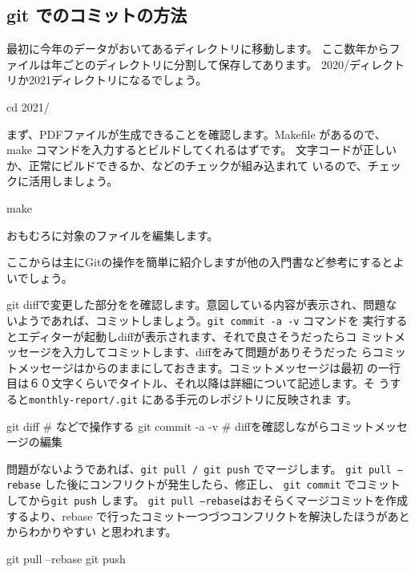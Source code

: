 \documentclass[mingoth,a4paper]{jsarticle}
\begin{document}
\subsection{git でのコミットの方法}

最初に今年のデータがおいてあるディレクトリに移動します。
ここ数年からファイルは年ごとのディレクトリに分割して保存してあります。
2020/ディレクトリか2021ディレクトリになるでしょう。

\begin{commandline}
cd 2021/
\end{commandline}

まず、PDFファイルが生成できることを確認します。Makefile があるので、make 
コマンドを入力するとビルドしてくれるはずです。
文字コードが正しいか、正常にビルドできるか、などのチェックが組み込まれて
いるので、チェックに活用しましょう。

\begin{commandline}
 make
\end{commandline}

おもむろに対象のファイルを編集します。

ここからは主にGitの操作を簡単に紹介しますが他の入門書など参考にするとよいでしょう。

git diffで変更した部分をを確認します。意図している内容が表示され、問題な
いようであれば、コミットしましょう。\texttt{git commit -a -v} コマンドを
実行するとエディターが起動しdiffが表示されます、それで良さそうだったらコ
ミットメッセージを入力してコミットします、diffをみて問題がありそうだった
らコミットメッセージはからのままにしておきます。コミットメッセージは最初
の一行目は６０文字くらいでタイトル、それ以降は詳細について記述します。そ
うすると\texttt{monthly-report/.git} にある手元のレポジトリに反映されま
す。

\begin{commandline}
 git diff  # などで操作する
 git commit -a -v  # diffを確認しながらコミットメッセージの編集 
\end{commandline}

問題がないようであれば、\texttt{git pull / git push} でマージします。
\texttt{git pull --rebase} した後にコンフリクトが発生したら、修正し、
\texttt{git commit} でコミットしてから\texttt{git push} します。
\texttt{git pull --rebase}はおそらくマージコミットを作成するより、rebase
で行ったコミット一つづつコンフリクトを解決したほうがあとからわかりやすい
と思われます。

\begin{commandline}
 git pull --rebase
 git push 
\end{commandline}
\end{document}
